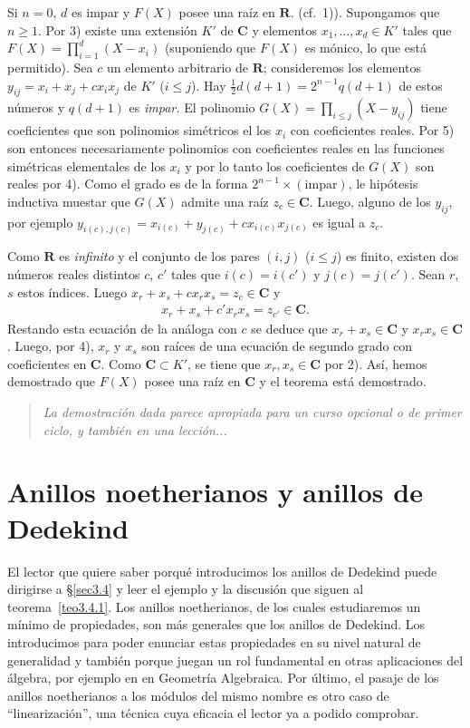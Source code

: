 \documentclass[bibtotoc,leqno,spanish]{amsbook}
\newcommand{\RR}{\mathbf{R}}
\newcommand{\CC}{\mathbf{C}}
\numberwithin{equation}{section}
\newenvironment{comm}%
	{\begin{quotation}\itshape}
	{\end{quotation}}
\theoremstyle{note}
\theoremstyle{note}
\theoremstyle{rem}
\numberwithin{theorem}{section}
\numberwithin{proposition}{section}
\numberwithin{definition}{section}
\numberwithin{lemma}{section}
\numberwithin{corollary}{section}
\numberwithin{example}{section}
\numberwithin{footnote}{section}%
\begin{document}
Si $n = 0$, $d$ es impar y
$F(X)$ posee una ra\'iz en $\RR$. (cf.~1)). Supongamos que $n \geq 1$. Por 3) existe una extensi\'on
$K'$ de $\CC$ y elementos $x_{1},\dots,x_{d}\in K'$ tales que $F(X) = \prod_{i=1}^{d}(X-x_{i})$
(suponiendo que $F(X)$ es m\'onico, lo que est\'a permitido). Sea $c$ un elemento arbitrario de $\RR$;
consideremos los elementos $y_{ij} = x_{i}+x_{j}+cx_{i}x_{j}$ de $K'$ ($i\leq j$). Hay
$\frac{1}{2}d(d+1) = 2^{n-1}q(d+1)$ de estos n\'umeros y $q(d+1)$ es {\em impar.} El polinomio
$G(X) = \prod_{i\leq j}(X-y_{ij})$ tiene coeficientes que son polinomios sim\'etricos el los $x_{i}$
con coeficientes reales. Por 5) son entonces necesariamente polinomios con coeficientes reales
en las funciones sim\'etricas elementales de los $x_{i}$ y por lo tanto los coeficientes de $G(X)$
son reales por 4). Como el grado es de la forma $2^{n-1}\times(\text{impar})$, le hip\'otesis
inductiva muestar que $G(X)$ admite una ra\'iz $z_{c}\in\CC$. Luego, alguno de los $y_{ij}$,
por ejemplo $y_{i(c),j(c)} = x_{i(c)}+y_{j(c)}+cx_{i(c)}x_{j(c)}$ es igual a $z_{c}$.

Como $\RR$ es {\em infinito} y el conjunto de los pares $(i,j)$ ($i\leq j$) es finito, existen
dos n\'umeros reales distintos $c$, $c'$ tales que $i(c) = i(c')$ y $j(c) = j(c')$. Sean $r$, $s$
estos \'indices. Luego $x_{r}+x_{s}+cx_{r}x_{s} = z_{c}\in\CC$ y
\begin{gather*}
x_{r}+x_{s}+c'x_{r}x_{s}=z_{c'}\in\CC.
\end{gather*}
Restando esta ecuaci\'on de la an\'aloga con $c$ se deduce que $x_{r}+x_{s}\in\CC$ y $x_{r}x_{s}\in\CC$.
Luego, por 4), $x_{r}$ y $x_{s}$ son ra\'ices de una ecuaci\'on de segundo grado con coeficientes
en $\CC$. Como $\CC\subset K'$, se tiene que $x_{r},x_{s}\in\CC$ por 2). As\'i, hemos demostrado que
$F(X)$ posee una ra\'iz en $\CC$ y el teorema est\'a demostrado.

\begin{comm}
La demostraci\'on dada parece apropiada para un curso opcional o de primer ciclo, y tambi\'en
en una lecci\'on...
\end{comm}

\chapter{Anillos noetherianos y anillos de Dedekind}\label{cap3}

El lector que quiere saber porqu\'e introducimos los anillos de Dedekind puede dirigirse
a \S\ref{sec3.4} y leer el ejemplo y la discusi\'on que siguen al teorema~\ref{teo3.4.1}.
Los anillos noetherianos, de los cuales estudiaremos un m\'inimo de propiedades, son m\'as generales que los
anillos de Dedekind. Los introducimos para poder enunciar estas propiedades en su
nivel natural de generalidad y tambi\'en porque juegan un rol fundamental en otras aplicaciones
del \'algebra, por ejemplo en en Geometr\'ia Algebraica. Por \'ultimo, el pasaje de los anillos noetherianos
a los m\'odulos del mismo nombre es otro caso de ``linearizaci\'on'', una t\'ecnica cuya eficacia
el lector ya a podido comprobar.
\end{document}
